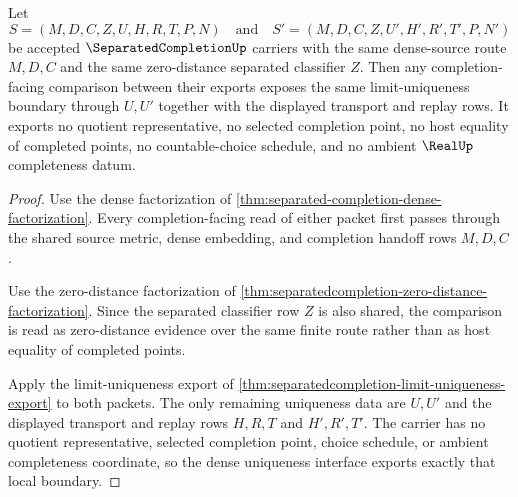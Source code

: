 \begin{theorem}
\label{thm:separatedcompletion-dense-uniqueness-interface}
Let
$$
S=(M,D,C,Z,U,H,R,T,P,N)
\quad\text{and}\quad
S'=(M,D,C,Z,U',H',R',T',P,N')
$$
be accepted $\SeparatedCompletionUp$ carriers with the same dense-source route $M,D,C$ and the same zero-distance separated classifier $Z$. Then any completion-facing comparison between their exports exposes the same limit-uniqueness boundary through $U,U'$ together with the displayed transport and replay rows. It exports no quotient representative, no selected completion point, no host equality of completed points, no countable-choice schedule, and no ambient $\RealUp$ completeness datum.
\end{theorem}
\begin{proof}
Use the dense factorization of \autoref{thm:separated-completion-dense-factorization}. Every completion-facing read of either packet first passes through the shared source metric, dense embedding, and completion handoff rows $M,D,C$.

Use the zero-distance factorization of \autoref{thm:separatedcompletion-zero-distance-factorization}. Since the separated classifier row $Z$ is also shared, the comparison is read as zero-distance evidence over the same finite route rather than as host equality of completed points.

Apply the limit-uniqueness export of \autoref{thm:separatedcompletion-limit-uniqueness-export} to both packets. The only remaining uniqueness data are $U,U'$ and the displayed transport and replay rows $H,R,T$ and $H',R',T'$. The carrier has no quotient representative, selected completion point, choice schedule, or ambient completeness coordinate, so the dense uniqueness interface exports exactly that local boundary.
\end{proof}

